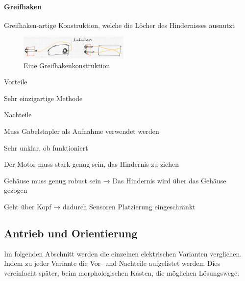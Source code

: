 \documentclass[../main.tex]{subfiles}
\begin{document}
\paragraph{Greifhaken}
Greifhaken-artige Konstruktion, welche die Löcher des Hindernisses ausnutzt

\begin{figure}[h!]
        \centering
        \includegraphics[width=0.48\textwidth]{img/technologierecherche/Rotation/harponne.jpg}
        \caption{Eine Greifhakenkonstruktion}
        \label{img:tech_harponne}
\end{figure}

\begin{minipage}[t]{0.48\textwidth}
    \begin{items}
          \item [Vorteile]
          \item Sehr einzigartige Methode
    \end{items}
\end{minipage}
\hfill
\begin{minipage}[t]{0.48\textwidth}
    \begin{items}
          \item [Nachteile]
          \item Muss Gabelstapler als Aufnahme verwendet werden
          \item Sehr unklar, ob funktioniert
          \item Der Motor muss stark genug sein, das Hindernis zu ziehen
          \item Gehäuse muss genug robust sein → Das Hindernis wird über das Gehäuse gezogen
          \item Geht über Kopf → dadurch Sensoren Platzierung eingeschränkt
    \end{items}
\end{minipage}
\newpage
\subsection{Antrieb und Orientierung}
Im folgenden Abschnitt werden die einzelnen elektrischen Varianten verglichen. Indem zu jeder Variante die Vor- und Nachteile aufgelistet werden. Dies vereinfacht später, beim morphologischen Kasten, die möglichen Lösungswege.
\end{document}
